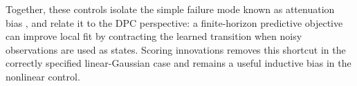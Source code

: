 \documentclass{article}
\theoremstyle{plain}
\theoremstyle{definition}
\theoremstyle{remark}
\begin{document}
Together, these controls isolate the simple failure mode known as attenuation bias \citep{fuller1987measurement,staudenmayer2005measurement}, and relate it to the DPC perspective: a finite-horizon predictive objective can improve local fit by contracting the learned transition when noisy observations are used as states. Scoring innovations removes this shortcut in the correctly specified linear-Gaussian case and remains a useful inductive bias in the nonlinear control.
\end{document}
